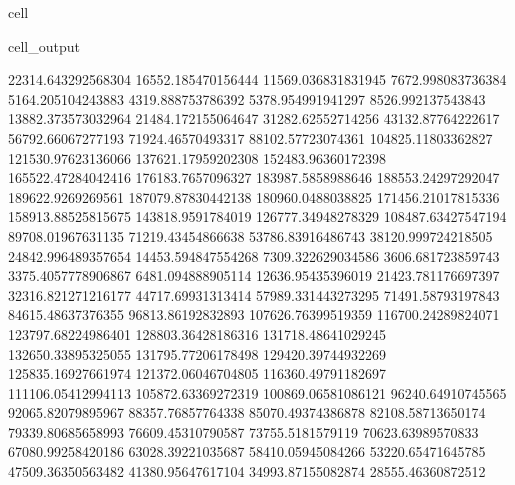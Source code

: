 \documentclass[letterpaper,10pt,english]{jupyterBook}
\begin{document}
\begin{sphinxuseclass}{cell}
\begin{sphinxVerbatimOutput}
\begin{sphinxuseclass}{cell_output}
\begin{sphinxVerbatim}[commandchars=\\\{\}]
22314.643292568304  16552.185470156444  11569.036831831945  7672.998083736384  5164.205104243883  4319.888753786392  5378.954991941297  8526.992137543843  13882.373573032964  21484.172155064647  31282.62552714256  43132.87764222617  56792.66067277193  71924.46570493317  88102.57723074361  104825.11803362827  121530.97623136066  137621.17959202308  152483.96360172398  165522.47284042416  176183.7657096327  183987.5858988646  188553.24297292047  189622.9269269561  187079.87830442138  180960.0488038825  171456.21017815336  158913.88525815675  143818.9591784019  126777.34948278329  108487.63427547194  89708.01967631135  71219.43454866638  53786.83916486743  38120.999724218505  24842.996489357654  14453.594847554268  7309.322629034586  3606.681723859743  3375.4057778906867  6481.094888905114  12636.95435396019  21423.781176697397  32316.821271216177  44717.69931313414  57989.331443273295  71491.58793197843  84615.48637376355  96813.86192832893  107626.76399519359  116700.24289824071  123797.68224986401  128803.36428186316  131718.48641029245  132650.33895325055  131795.77206178498  129420.39744932269  125835.16927661974  121372.06046704805  116360.49791182697  111106.05412994113  105872.63369272319  100869.06581086121  96240.64910745565  92065.82079895967  88357.76857764338  85070.49374386878  82108.58713650174  79339.80685658993  76609.45310790587  73755.5181579119  70623.63989570833  67080.99258420186  63028.39221035687  58410.05945084266  53220.65471645785  47509.36350563482  41380.95647617104  34993.87155082874  28555.46360872512  

\end{sphinxVerbatim}
\end{sphinxuseclass}
\end{sphinxVerbatimOutput}
\end{sphinxuseclass}
\end{document}
